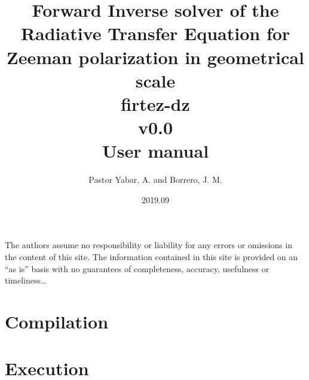\documentclass[12pt,a4]{article}
\begin{document}
\title{Forward Inverse solver of the Radiative Transfer Equation for Zeeman polarization in geometrical scale\\firtez-dz\\v0.0\\User manual}
\author{Pastor Yabar, A. and Borrero, J. M.}
\date{2019.09}
\maketitle

\clearpage
\tableofcontents
%
\clearpage
\vspace*{\fill}
\noindent The authors assume no responsibility or liability for any errors or omissions in the content of this site. The information contained in this site is provided on an ``as is'' basis with no guarantees of completeness, accuracy, usefulness or timeliness\ldots
%
\clearpage
\section{Compilation}

%
\clearpage
\section{Execution}

\end{document}

